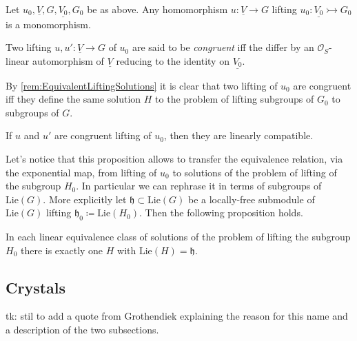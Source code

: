\documentclass[../Main]{subfiles}
\begin{document}
\begin{lem}
	Let $u_0, \underline{V}, G, \underline{V_0}, G_0$ be as above.
	Any homomorphism $u\colon \underline{V} \to G$ lifting 
	$u_0\colon \underline{V_0} \rightarrowtail G_0$
	is a monomorphism.
\end{lem} 


\begin{defn}
	Two lifting $u, u'\colon \underline{V} \to G$ of $u_0$ are said to
	be {\em congruent} iff the differ by an $\mathcal{O}_{ S }$-linear
	automorphism of $\underline{V}$ reducing to the identity on $\underline{V_0}$.
\end{defn}


\begin{rem}[]
	By \cref{rem:EquivalentLiftingSolutions} it is clear that
	two lifting of $u_0$ are congruent iff they define the same solution
	$H$ to the problem of lifting subgroups of $G_0$ to subgroups of $G$.
\end{rem}


\begin{lem}
	If $u$ and $u'$ are congruent lifting of $u_0$, then
	they are linearly compatible.
\end{lem} 


\begin{rem}[]
	Let's notice that this proposition allows to
	transfer the equivalence relation, via the exponential map,
	from lifting of $u_0$ to solutions of the problem of lifting
	of the subgroup $H_0$.
	In particular we can rephrase it in terms of subgroups
	of $\mathrm{Lie}(G)$. More explicitly
	let $\mathfrak{h} \subset \mathrm{Lie}(G)$ be a locally-free
	submodule of $\mathrm{Lie}(G)$ lifting
	$\mathfrak{h}_0 \coloneqq \mathrm{Lie}(H_0)$.
	Then the following proposition holds.
\end{rem}


\begin{prop}
	In each linear equivalence class of solutions of
	the problem of lifting the subgroup $H_0$
	there is exactly one $H$ with 
	$\mathrm{Lie}(H) = \mathfrak{h}$.
\end{prop}



\subsection{Crystals}
tk: stil to add a quote from Grothendiek explaining the reason
for this name and a description of the two subsections.
\end{document}

